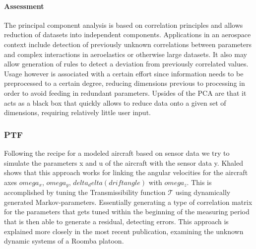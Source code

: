 \paragraph{Assessment}


The principal component analysis is based on correlation principles and allows reduction of datasets into independent components. Applications in an aerospace context include detection of previously unknown correlations between parameters and complex interactions in aeroelastics or otherwise large datasets. It also may allow generation of rules to detect a deviation from previously correlated values. Usage however is associated with a certain effort since information needs to be preprocessed to a certain degree, reducing dimensions previous to processing in order to avoid feeding in redundant parameters. Upsides of the PCA are that it acts as a black box that quickly allows to reduce data onto a given set of dimensions, requiring relatively little user input.






\subsubsection{PTF}


Following the recipe for a modeled aircraft based on sensor data we try to simulate the parameters x and u of the aircraft with the sensor data y. Khaled shows that this approach works for linking the angular velocities for the aircraft axes $omega_x$, $omega_y$, $delta_delta(drift angle)$ with $omega_z$. This is accomplished by tuning the Transmissibility function $\mathcal{T}$ using dynamically generated Markov-parameters. Essentially generating a type of correlation matrix for the parameters that gets tuned within the beginning of the measuring period that is then able to generate a residual, detecting errors. This approach is explained more closely in the most recent publication, examining the unknown dynamic systems of a Roomba platoon. \cite{khalil_transmissibility-based_2022, khalil_transmissibility-based_2022-1, wolter_anwendung_2014}

